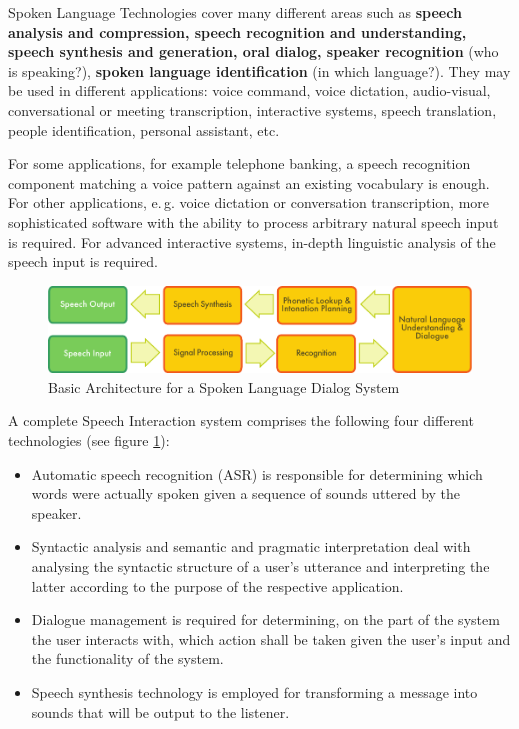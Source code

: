 \begin{multicols}{2}
Spoken Language Technologies cover many different areas such as 
{\bf speech analysis and compression, speech recognition and
  understanding, speech synthesis and generation, oral dialog, speaker
  recognition} (who is speaking?), {\bf spoken language
  identification} (in which language?). They may be used in different
applications: voice command, voice dictation, audio-visual,
conversational or meeting transcription, interactive systems, speech
translation, people identification, personal assistant, etc.

For some applications, for example telephone banking, a speech
recognition component matching a voice pattern against an existing
vocabulary is enough. For other applications, e.\,g. voice dictation or
conversation transcription, more sophisticated software with the
ability to process arbitrary natural speech input is required. For
advanced interactive systems, in-depth linguistic analysis of the
speech input is required.


\begin{figure}
\begin{center}
 \includegraphics[width=\textwidth]{../_media/english/simple_speech-based_dialogue_architecture} 
\caption{Basic Architecture for a Spoken Language Dialog System}
\label{fig:sldsEng}
\end{center}
\end{figure}

A complete Speech Interaction system comprises the following four
different technologies (see figure \ref{fig:sldsEng}):
\begin{itemize}
\item Automatic speech recognition (ASR) is responsible for
  determining which words were actually spoken given a sequence of
  sounds uttered by the speaker.
\item Syntactic analysis and semantic and pragmatic interpretation
  deal with analysing the syntactic structure of a user's utterance
  and interpreting the latter according to the purpose of the
  respective application.
\item Dialogue management is required for determining, on the part of
  the system the user interacts with, which action shall be taken
  given the user's input and the functionality of the system.
\item Speech synthesis technology is employed for transforming a
  message into sounds that will be output to the listener.
\end{itemize}


\end{multicols}
